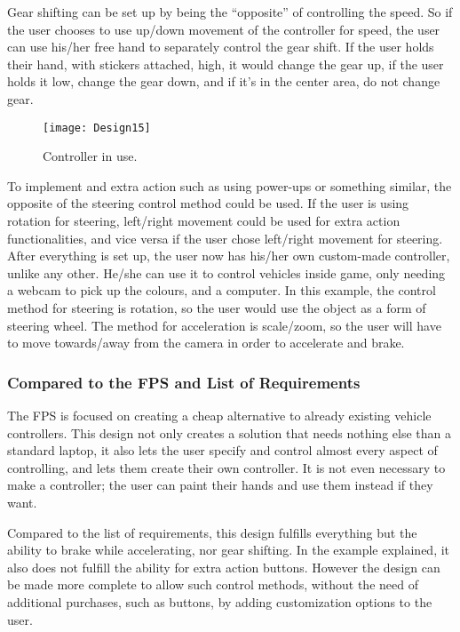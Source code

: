 \bigskip

Gear shifting can be set up by being the “opposite” of controlling the speed. So if the user chooses to use up/down movement of the controller for speed, the user can use his/her free hand to separately control the gear shift. If the user holds their hand, with stickers attached, high, it would change the gear up, if the user holds it low, change the gear down, and if it’s in the center area, do not change gear.

\begin{figure}[h]
\centering
\texttt{[image: Design15]}
\caption{Controller in use.}
\label{fig:design15}
\end{figure}

To implement and extra action such as using power-ups or something similar, the opposite of the steering control method could be used. If the user is using rotation for steering, left/right movement could be used for extra action functionalities, and vice versa if the user chose left/right movement for steering.
After everything is set up, the user now has his/her own custom-made controller, unlike any other. He/she can use it to control vehicles inside game, only needing a webcam to pick up the colours, and a computer. In this example, the control method for steering is rotation, so the user would use the object as a form of steering wheel. The method for acceleration is scale/zoom, so the user will have to move towards/away from the camera in order to accelerate and brake.

\subsubsection*{Compared to the FPS and List of Requirements}
The FPS is focused on creating a cheap alternative to already existing vehicle controllers. This design not only creates a solution that needs nothing else than a standard laptop, it also lets the user specify and control almost every aspect of controlling, and lets them create their own controller. It is not even necessary to make a controller; the user can paint their hands and use them instead if they want.

Compared to the list of requirements, this design fulfills everything but the ability to brake while accelerating, nor gear shifting. In the example explained, it also does not fulfill the ability for extra action buttons. However the design can be made more complete to allow such control methods, without the need of additional purchases, such as buttons, by adding customization options to the user.


